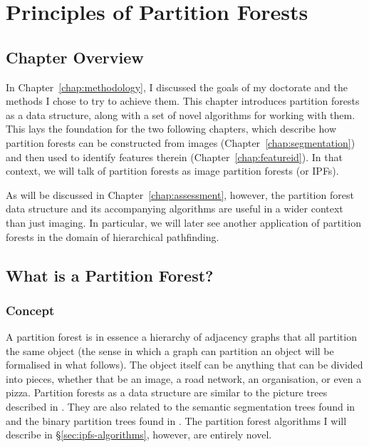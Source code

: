 \chapter{Principles of Partition Forests}
\label{chap:ipfs}

\section{Chapter Overview}

In Chapter~\ref{chap:methodology}, I discussed the goals of my doctorate and the methods I chose to try to achieve them. This chapter introduces partition forests as a data structure, along with a set of novel algorithms for working with them. This lays the foundation for the two following chapters, which describe how partition forests can be constructed from images (Chapter~\ref{chap:segmentation}) and then used to identify features therein (Chapter~\ref{chap:featureid}). In that context, we will talk of partition forests as image partition forests (or IPFs).

As will be discussed in Chapter~\ref{chap:assessment}, however, the partition forest data structure and its accompanying algorithms are useful in a wider context than just imaging. In particular, we will later see another application of partition forests in the domain of hierarchical pathfinding.

\section{What is a Partition Forest?}

\subsection{Concept}

A partition forest is in essence a hierarchy of adjacency graphs that all partition the same object (the sense in which a graph can partition an object will be formalised in what follows). The object itself can be anything that can be divided into pieces, whether that be an image, a road network, an organisation, or even a pizza. Partition forests as a data structure are similar to the picture trees described in \cite{andrade03}. They are also related to the semantic segmentation trees found in \cite{al-haj08} and the binary partition trees found in \cite{salembier00}. The partition forest algorithms I will describe in \S\ref{sec:ipfs-algorithms}, however, are entirely novel.

